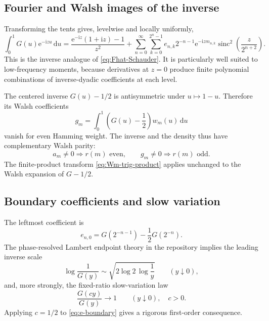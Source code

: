 \documentclass[11pt,oneside]{article}
\theoremstyle{definition}
\theoremstyle{remark}
\newcommand{\sinc}{\operatorname{sinc}}
\newcommand{\e}{\mathrm e}
\newcommand{\ii}{\mathrm i}
\newcommand{\dd}{\,\mathrm d}
\begin{document}
\subsection{Fourier and Walsh images of the inverse}

Transforming the tents gives, levelwise and locally uniformly,
\begin{equation}\label{eq:Ghat-Schauder}
 \int_0^1G(u)\e^{-\ii zu}\dd u
 =\frac{\e^{-\ii z}(1+\ii z)-1}{z^2}
 +\sum_{n=0}^\infty\sum_{k=0}^{2^n-1}
 e_{n,k}2^{-n-1}\e^{-\ii zm_{n,k}}
 \sinc^2\!\left(\frac{z}{2^{n+2}}\right).
\end{equation}
This is the inverse analogue of \eqref{eq:Fhat-Schauder}.  It is particularly
well suited to low-frequency moments, because derivatives at $z=0$ produce
finite polynomial combinations of inverse-dyadic coefficients at each level.

The centered inverse $G(u)-1/2$ is antisymmetric under $u\mapsto1-u$.
Therefore its Walsh coefficients
\begin{equation}\label{eq:G-Walsh-coeff}
 g_m=\int_0^1\left(G(u)-\frac12\right)w_m(u)\dd u
\end{equation}
vanish for even Hamming weight.  The inverse and the density thus have
complementary Walsh parity:
\begin{equation}\label{eq:complementary-Walsh-parity}
 a_m\ne0\Rightarrow r(m)\text{ even},
 \qquad
 g_m\ne0\Rightarrow r(m)\text{ odd}.
\end{equation}
The finite-product transform \eqref{eq:Wm-trig-product} applies unchanged to
the Walsh expansion of $G-1/2$.

\subsection{Boundary coefficients and slow variation}

The leftmost coefficient is
\begin{equation}\label{eq:e-boundary}
 e_{n,0}=G(2^{-n-1})-\frac12G(2^{-n}).
\end{equation}
The phase-resolved Lambert endpoint theory in the repository implies the
leading inverse scale
\begin{equation}\label{eq:G-leading-log}
 \log\frac1{G(y)}
 \sim\sqrt{2\log2\,\log\frac1y}
 \qquad(y\downarrow0),
\end{equation}
and, more strongly, the fixed-ratio slow-variation law
\begin{equation}\label{eq:G-slow-variation}
 \frac{G(cy)}{G(y)}\longrightarrow1
 \qquad(y\downarrow0),\quad c>0.
\end{equation}
Applying $c=1/2$ to \eqref{eq:e-boundary} gives a rigorous first-order
consequence.
\end{document}
